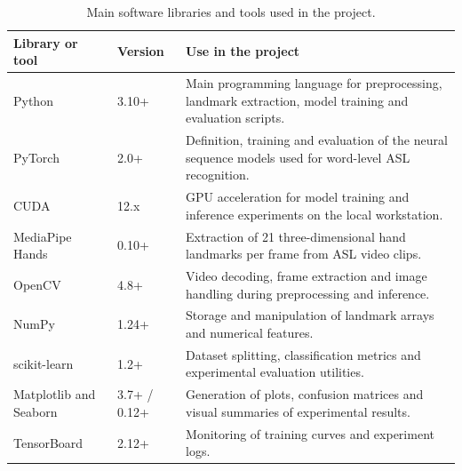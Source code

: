 \begin{table}[!htbp]
    \centering
    \small
    \renewcommand{\arraystretch}{1.2}
    \caption{Main software libraries and tools used in the project.}
    \label{tab:software_libraries}
    \begin{tabular}{@{}p{3.0cm} p{3.0cm} p{7.2cm}@{}}
        \toprule
        \textbf{Library or tool}                          & \textbf{Version} & \textbf{Use in the project}                                                                              \\
        \midrule
        Python                                            & 3.10+            & Main programming language for preprocessing, landmark extraction, model training and evaluation scripts. \\
        PyTorch                                           & 2.0+             & Definition, training and evaluation of the neural sequence models used for word-level ASL recognition.   \\
        CUDA                                              & 12.x             & GPU acceleration for model training and inference experiments on the local workstation.                  \\
        MediaPipe Hands                                   & 0.10+            & Extraction of 21 three-dimensional hand landmarks per frame from ASL video clips.                        \\
        OpenCV                                            & 4.8+             & Video decoding, frame extraction and image handling during preprocessing and inference.                  \\
        NumPy                                             & 1.24+            & Storage and manipulation of landmark arrays and numerical features.                                      \\
        scikit-learn                                      & 1.2+             & Dataset splitting, classification metrics and experimental evaluation utilities.                         \\
        Matplotlib and Seaborn                            & 3.7+ / 0.12+     & Generation of plots, confusion matrices and visual summaries of experimental results.                    \\
        TensorBoard                                       & 2.12+            & Monitoring of training curves and experiment logs.                                                       \\

\end{tabular}
\end{table}
